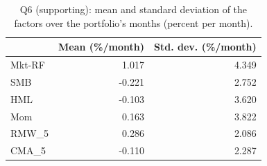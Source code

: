 \begin{table}
\caption{Q6 (supporting): mean and standard deviation of the factors over the portfolio's months (percent per month).}
\label{tab:q6d}
\begin{tabular}{lrr}
\toprule
 & Mean (\%/month) & Std. dev. (\%/month) \\
\midrule
Mkt-RF & 1.017 & 4.349 \\
SMB & -0.221 & 2.752 \\
HML & -0.103 & 3.620 \\
Mom & 0.163 & 3.822 \\
RMW\_5 & 0.286 & 2.086 \\
CMA\_5 & -0.110 & 2.287 \\
\bottomrule
\end{tabular}
\end{table}
